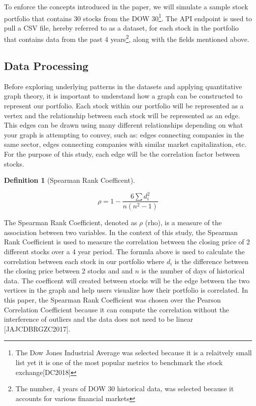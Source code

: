 \documentclass{article}
\newtheorem{definition}[theorem]{Definition}
\begin{document}
To enforce the concepts introduced in the paper, we will simulate a sample stock portfolio that contains 30 stocks from the DOW 30\footnote{The Dow Jones Industrial Average was selected because it is a relaitvely small list yet it is one of the most popular metrics to benchmark the stock exchange[DC2018]}. The API endpoint is used to pull a CSV file, hereby referred to as a dataset, for each stock in the portfolio that contains data from the past 4 years\footnote{The number, 4 years of DOW 30 historical data, was selected because it accounts for various financial markets}, along with the fields mentioned above.

\subsection{Data Processing}

Before exploring underlying patterns in the datasets and applying quantitative graph theory, it is important to understand how a graph can be constructed to represent our portfolio. Each stock within our portfolio will be represented as a vertex and the relationship between each stock will be represented as an edge. This edges can be drawn using many different relationships depending on what your graph is attempting to convey, such as: edges connecting companies in the same sector, edges connecting companies with similar market capitalization, etc. For the purpose of this study, each edge will be the correlation factor between stocks.

\begin{definition}[Spearman Rank Coefficent]
\end{definition}

\[
\rho = 1 - \frac{6 \sum d_i^2}{n(n^2-1)}
\]

The Spearman Rank Coefficient, denoted as $\rho$ (rho), is a measure of the association between two variables. In the context of this study, the Spearman Rank Coefficient is used to measure the correlation between the closing price of 2 different stocks over a 4 year period. The formula above is used to calculate the correlation between each stock in our portfolio where $d_i$ is the difference between the closing price between 2 stocks and and $n$ is the number of days of historical data. The coefficent will created between stocks will be the edge between the two vertices in the graph and help users visualize how their portfolio is correlated. In this paper, the Spearman Rank Coefficient was chosen over the Pearson Correlation Coefficient because it can compute the correlation without the interference of outliers and the data does not need to be linear [JAJCDBRGZC2017].
\end{document}
